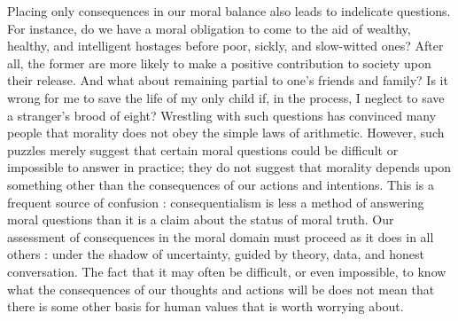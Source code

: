 \documentclass[a4paper,14pt]{extarticle}
\begin{document}
Placing only consequences in our moral balance also leads to indelicate questions.
For instance, do we have a moral obligation to come to the aid of wealthy, healthy, and intelligent hostages before poor, sickly, and slow-witted ones?
After all, the former are more likely to make a positive contribution to society upon their release.
And what about remaining partial to one's friends and family?
Is it wrong for me to save the life of my only child if, in the process, I neglect to save a stranger's brood of eight?
Wrestling with such questions has convinced many people that morality does not obey the simple laws of arithmetic.
However, such puzzles merely suggest that certain moral questions could be difficult or impossible to answer in practice;
they do not suggest that morality depends upon something other than the consequences of our actions and intentions.
This is a frequent source of confusion :
consequentialism is less a method of answering moral questions than it is a claim about the status of moral truth.
Our assessment of consequences in the moral domain must proceed as it does in all others :
under the shadow of uncertainty, guided by theory, data, and honest conversation.
The fact that it may often be difficult, or even impossible, to know what the consequences of our thoughts and actions will be does not mean that there is some other basis for human values that is worth worrying about.
\end{document}
